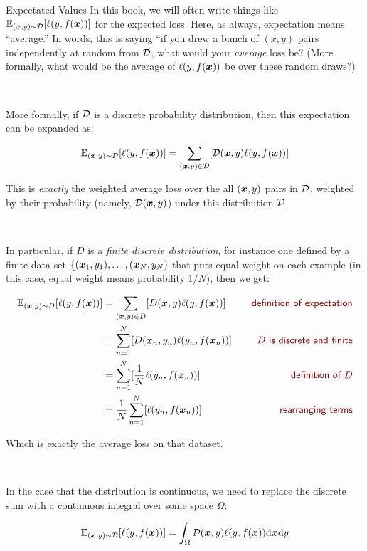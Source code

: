 \begin{mathreview}{Expectated Values}
In this book, we will often write things like $\mathbb{E}_{({\boldsymbol{x}},y) \sim \mathcal{D}} [ \ell(y, f({\boldsymbol{x}})) ]$ for the expected loss. Here, as always, expectation means ``average.'' In words, this is saying ``if you drew a bunch of $(x,y)$ pairs independently at random from $\mathcal{D}$, what would your \emph{average} loss be? (More formally, what would be the average of $\ell(y,f({\boldsymbol{x}}))$ be over these random draws?)

~

More formally, if $\mathcal{D}$ is a discrete probability distribution, then this expectation can be expanded as:

\begin{equation}
  \mathbb{E}_{({\boldsymbol{x}},y) \sim \mathcal{D}} [ \ell(y, f({\boldsymbol{x}})) ] = \sum_{({\boldsymbol{x}},y) \in \mathcal{D}} [ \mathcal{D}({\boldsymbol{x}},y) \ell(y, f({\boldsymbol{x}})) ]
\end{equation}

This is \emph{exactly} the weighted average loss over the all $({\boldsymbol{x}},y)$ pairs in $\mathcal{D}$, weighted by their probability (namely, $\mathcal{D}({\boldsymbol{x}},y)$) under this distribution $\mathcal{D}$.

~

In particular, if $D$ is a \emph{finite discrete distribution}, for instance one defined by a finite data set $\{ ({\boldsymbol{x}}_1,y_1), \dots, ({\boldsymbol{x}}_N,y_N)$ that puts equal weight on each example (in this case, equal weight means probability $1/N$), then we get:

\begin{align}
\Ep_{(\vx,y) \sim D} [ \ell(y, f(\vx)) ] 
&= \sum_{(\vx,y) \in D} [ D(\vx,y) \ell(y, f(\vx)) ]
   \becauseof{definition of expectation}\\
&= \sum_{n=1}^N [ D(\vx_n,y_n) \ell(y_n, f(\vx_n)) ]
   \becauseof{$D$ is discrete and finite}\\
&= \sum_{n=1}^N [ \frac 1 N \ell(y_n, f(\vx_n)) ] 
   \becauseof{definition of $D$}\\
&= \frac 1 N  \sum_{n=1}^N [ \ell(y_n, f(\vx_n)) ]
   \becauseof{rearranging terms}
\end{align}

Which is exactly the average loss on that dataset.

~

In the case that the distribution is continuous, we need to replace the discrete sum with a continuous integral over some space $\Omega$:

\begin{equation}
  \mathbb{E}_{({\boldsymbol{x}},y) \sim \mathcal{D}} [ \ell(y, f({\boldsymbol{x}})) ] = \int_{\Omega} \mathcal{D}({\boldsymbol{x}},y) \ell(y, f({\boldsymbol{x}})) \textrm{d} {\boldsymbol{x}} \textrm{d} y
\end{equation}


\end{mathreview}
